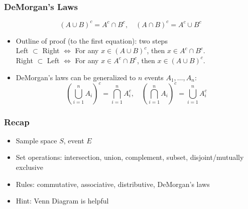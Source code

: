 \documentclass[slidestop,compress,mathserif]{beamer}
\begin{document}
\begin{frame}\frametitle{DeMorgan's Laws}

\[(A \cup B)^c = A^c \cap B^c, \quad
(A \cap B)^c = A^c \cup B^c\]

\pause

\begin{itemize}
\item Outline of proof (to the first equation): two steps\\
Left $\subset$ Right $\Longleftrightarrow$ For any $x \in (A \cup B)^c$, then $x \in A^c \cap B^c$.\\
Right $\subset$ Left $\Longleftrightarrow$ For any $x \in A^c \cap B^c$, then $x \in (A \cup B)^c$.\\

\pause
\vspace{2.8cm}
\item DeMorgan's laws can be generalized to $n$ events $A_1, \ldots, A_n$:
\[
\left(\bigcup\limits_{i=1}^n  A_i \right)^c  =  \bigcap_{i=1}^n A_i^c, \quad
\left(\bigcap\limits_{i=1}^n  A_i \right)^c  =  \bigcup_{i=1}^n A_i^c
\]
\end{itemize}

\pause
{}


\end{frame}

\begin{frame}\frametitle{Recap}

\begin{itemize}

\item Sample space $S$, event $E$
\item Set operations: intersection, union, complement, subset, disjoint/mutually exclusive
\item Rules: commutative, associative, distributive, DeMorgan's laws
\item Hint: Venn Diagram is helpful
\end{itemize}

\end{frame}



%
%
\end{document}
